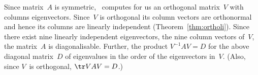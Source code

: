 \begin{example}
\begin{solution}
Since matrix~\(A\) is symmetric, \script\ computes for us an orthogonal matrix~\(V\) with columns eigenvectors.
Since~\(V\) is orthogonal its column vectors are orthonormal and hence its columns are linearly independent (Theorem~\ref{thm:ortholi}).
Since there exist nine linearly independent eigenvectors, the nine column vectors of~\(V\), the matrix~\(A\) is diagonalisable.
Further, the product \(V^{-1}AV=D\) for the above diagonal matrix~\(D\) of eigenvalues in the order of the eigenvectors in~\(V\).
(Also, since \(V\)~is orthogonal, \(\tr VAV=D\).)
\end{solution}
\end{example}





